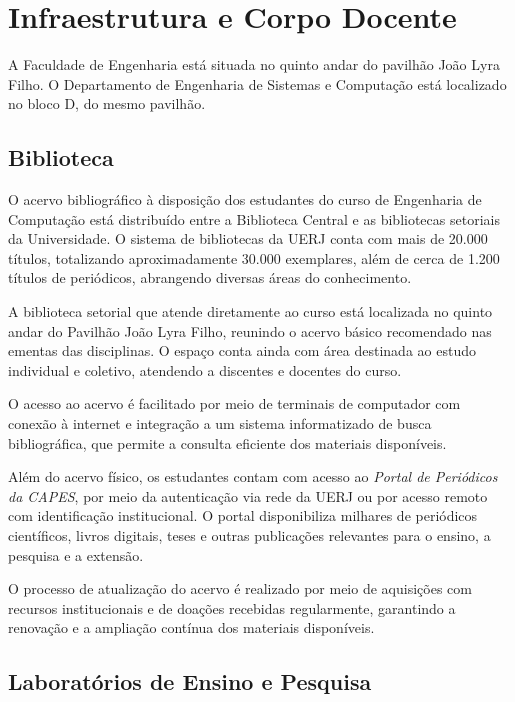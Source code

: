 \chapter{Infraestrutura e Corpo Docente}
\thispagestyle{plain}

A Faculdade de Engenharia está situada no quinto andar do pavilhão João Lyra Filho. O Departamento de Engenharia de Sistemas e Computação está localizado no bloco D, do mesmo pavilhão.

\section{Biblioteca}
O acervo bibliográfico à disposição dos estudantes do curso de Engenharia de Computação está distribuído entre a Biblioteca Central e as bibliotecas setoriais da Universidade. O sistema de bibliotecas da UERJ conta com mais de 20.000 títulos, totalizando aproximadamente 30.000 exemplares, além de cerca de 1.200 títulos de periódicos, abrangendo diversas áreas do conhecimento.

A biblioteca setorial que atende diretamente ao curso está localizada no quinto andar do Pavilhão João Lyra Filho, reunindo o acervo básico recomendado nas ementas das disciplinas. O espaço conta ainda com área destinada ao estudo individual e coletivo, atendendo a discentes e docentes do curso.

O acesso ao acervo é facilitado por meio de terminais de computador com conexão à internet e integração a um sistema informatizado de busca bibliográfica, que permite a consulta eficiente dos materiais disponíveis.

Além do acervo físico, os estudantes contam com acesso ao \textit{Portal de Periódicos da CAPES}, por meio da autenticação via rede da UERJ ou por acesso remoto com identificação institucional. O portal disponibiliza milhares de periódicos científicos, livros digitais, teses e outras publicações relevantes para o ensino, a pesquisa e a extensão.

O processo de atualização do acervo é realizado por meio de aquisições com recursos institucionais e de doações recebidas regularmente, garantindo a renovação e a ampliação contínua dos materiais disponíveis.


\section{Laboratórios de Ensino e Pesquisa}

